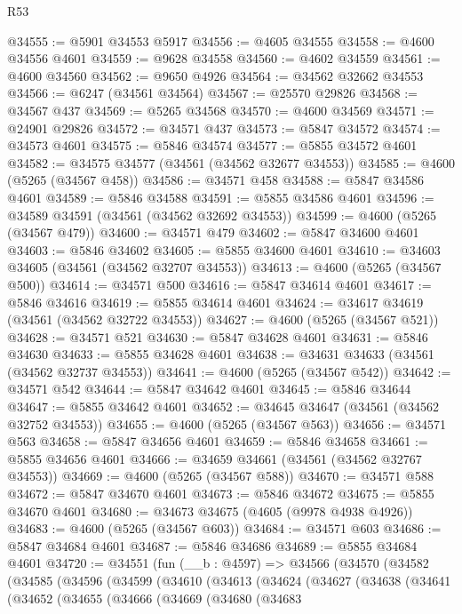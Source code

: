\begin{lexlean}{R53}
\begin{coremodule}
@34555 := @5901 @34553 @5917
@34556 := @4605 @34555
@34558 := @4600 @34556 @4601
@34559 := @9628 @34558
@34560 := @4602 @34559
@34561 := @4600 @34560
@34562 := @9650 @4926
@34564 := @34562 @32662 @34553
@34566 := @6247 (@34561 @34564)
@34567 := @25570 @29826
@34568 := @34567 @437
@34569 := @5265 @34568
@34570 := @4600 @34569
@34571 := @24901 @29826
@34572 := @34571 @437
@34573 := @5847 @34572
@34574 := @34573 @4601
@34575 := @5846 @34574
@34577 := @5855 @34572 @4601
@34582 := @34575 @34577 (@34561 (@34562 @32677 @34553))
@34585 := @4600 (@5265 (@34567 @458))
@34586 := @34571 @458
@34588 := @5847 @34586 @4601
@34589 := @5846 @34588
@34591 := @5855 @34586 @4601
@34596 := @34589 @34591 (@34561 (@34562 @32692 @34553))
@34599 := @4600 (@5265 (@34567 @479))
@34600 := @34571 @479
@34602 := @5847 @34600 @4601
@34603 := @5846 @34602
@34605 := @5855 @34600 @4601
@34610 := @34603 @34605 (@34561 (@34562 @32707 @34553))
@34613 := @4600 (@5265 (@34567 @500))
@34614 := @34571 @500
@34616 := @5847 @34614 @4601
@34617 := @5846 @34616
@34619 := @5855 @34614 @4601
@34624 := @34617 @34619 (@34561 (@34562 @32722 @34553))
@34627 := @4600 (@5265 (@34567 @521))
@34628 := @34571 @521
@34630 := @5847 @34628 @4601
@34631 := @5846 @34630
@34633 := @5855 @34628 @4601
@34638 := @34631 @34633 (@34561 (@34562 @32737 @34553))
@34641 := @4600 (@5265 (@34567 @542))
@34642 := @34571 @542
@34644 := @5847 @34642 @4601
@34645 := @5846 @34644
@34647 := @5855 @34642 @4601
@34652 := @34645 @34647 (@34561 (@34562 @32752 @34553))
@34655 := @4600 (@5265 (@34567 @563))
@34656 := @34571 @563
@34658 := @5847 @34656 @4601
@34659 := @5846 @34658
@34661 := @5855 @34656 @4601
@34666 := @34659 @34661 (@34561 (@34562 @32767 @34553))
@34669 := @4600 (@5265 (@34567 @588))
@34670 := @34571 @588
@34672 := @5847 @34670 @4601
@34673 := @5846 @34672
@34675 := @5855 @34670 @4601
@34680 := @34673 @34675 (@4605 (@9978 @4938 @4926))
@34683 := @4600 (@5265 (@34567 @603))
@34684 := @34571 @603
@34686 := @5847 @34684 @4601
@34687 := @5846 @34686
@34689 := @5855 @34684 @4601
@34720 := @34551
    (fun (__b : @4597) =>
    @34566
      (@34570
        (@34582
          (@34585
            (@34596
              (@34599
                (@34610
                  (@34613
                    (@34624
                      (@34627
                        (@34638
                          (@34641
                            (@34652
                              (@34655
                                (@34666
                                  (@34669
                                    (@34680
                                      (@34683

\end{coremodule}
\end{lexlean}
